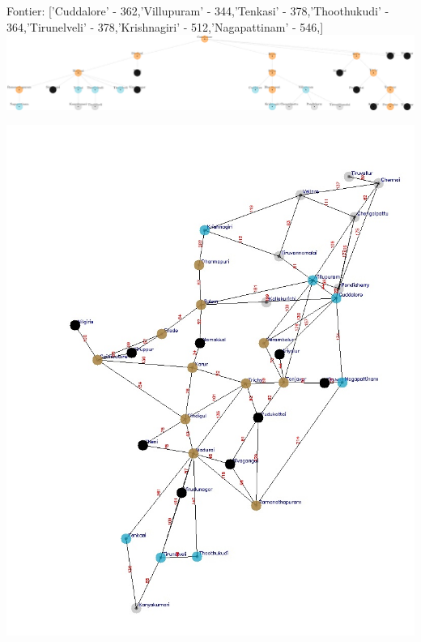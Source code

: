 \documentclass[xcolor=table]{beamer}
\begin{document}
\begin{frame}
  { \tiny Fontier: ['Cuddalore' - 362,'Villupuram' - 344,'Tenkasi' - 378,'Thoothukudi' - 364,'Tirunelveli' - 378,'Krishnagiri' - 512,'Nagapattinam' - 546,]}
  \includegraphics[width=1\textwidth]{../UCSNodes/31-1.png}
  \begin{center}
    \includegraphics[height=0.55\textheight]{../UCSoutput/tamilUCS29.jpg}
  \end{center}
\end{frame}
\end{document}
